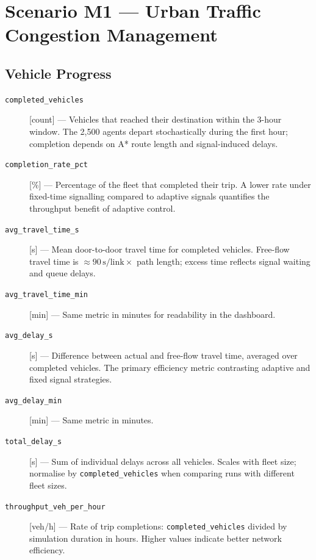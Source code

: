 \section{Scenario M1 --- Urban Traffic Congestion Management}
\label{sec:metrics-m1}

\subsection*{Vehicle Progress}

\begin{description}

\item[\texttt{completed\_vehicles}] [count] ---
  Vehicles that reached their destination within the 3-hour window.  The 2,500
  agents depart stochastically during the first hour; completion depends on A*
  route length and signal-induced delays.

\item[\texttt{completion\_rate\_pct}] [\%] ---
  Percentage of the fleet that completed their trip.  A lower rate under
  fixed-time signalling compared to adaptive signals quantifies the throughput
  benefit of adaptive control.

\item[\texttt{avg\_travel\_time\_s}] [s] ---
  Mean door-to-door travel time for completed vehicles.  Free-flow travel time
  is $\approx 90\,\text{s/link} \times$ path length; excess time reflects
  signal waiting and queue delays.

\item[\texttt{avg\_travel\_time\_min}] [min] ---
  Same metric in minutes for readability in the dashboard.

\item[\texttt{avg\_delay\_s}] [s] ---
  Difference between actual and free-flow travel time, averaged over completed
  vehicles.  The primary efficiency metric contrasting adaptive and fixed
  signal strategies.

\item[\texttt{avg\_delay\_min}] [min] ---
  Same metric in minutes.

\item[\texttt{total\_delay\_s}] [s] ---
  Sum of individual delays across all vehicles.  Scales with fleet size;
  normalise by \texttt{completed\_vehicles} when comparing runs with different
  fleet sizes.

\item[\texttt{throughput\_veh\_per\_hour}] [veh/h] ---
  Rate of trip completions: \texttt{completed\_vehicles} divided by simulation
  duration in hours.  Higher values indicate better network efficiency.

\end{description}

